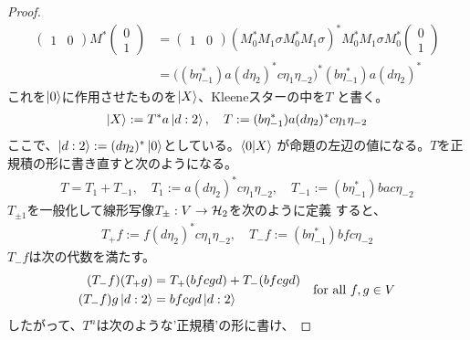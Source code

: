 {\begin{proof}
\begin{equation*}
\begin{split}
			\begin{pmatrix}
				1 & 0
			\end{pmatrix}M^*\begin{pmatrix}
				0 \\ 1
			\end{pmatrix} &= \begin{pmatrix}
				1 & 0
			\end{pmatrix}(M_0^*M_1\sigma M_0^*M_1\sigma)^*M_0^*M_1\sigma M_0^*
			\begin{pmatrix}
				0 \\ 1
			\end{pmatrix} \\
			&= \bigl((b\eta_{-1}^*)a(d\eta_2)^*c\eta_1\eta_{-2}\bigr)^*
			(b\eta_{-1}^*)a(d\eta_2)^*
		\end{split}\end{equation*}
		これを$\mathinner{|{0}\rangle}$に作用させたものを$\mathinner{|{X}\rangle}$、Kleeneスターの中を$T$
		と書く。
		\begin{equation*}\begin{split}
			\mathinner{|{X}\rangle} := T^*a\mathinner{|{d:2}\rangle},\quad
			T := (b\eta_{-1}^*)a(d\eta_2)^*c\eta_1\eta_{-2}
		\end{split}\end{equation*}
		ここで、$\mathinner{|{d:2}\rangle}:=(d\eta_2)^*\mathinner{|{0}\rangle}$としている。$\mathinner{\langle{0|X}\rangle}$
		が命題の左辺の値になる。$T$を正規積の形に書き直すと次のようになる。
		\begin{equation*}\begin{split}
			T = T_1 + T_{-1},\quad
			T_1 := a(d\eta_2)^*c\eta_1\eta_{-2},\quad
			T_{-1} := (b\eta_{-1}^*)bac\eta_{-2}
		\end{split}\end{equation*}
		$T_{\pm1}$を一般化して線形写像$T_\pm:V\to{\ensuremath{{\mathcal{H}}}}_2$を次のように定義
		すると、
		\begin{equation*}\begin{split}
			T_+f := f(d\eta_2)^*c\eta_1\eta_{-2},\quad
			T_-f := (b\eta_{-1}^*)bfc\eta_{-2}
		\end{split}\end{equation*}
		$T_{-}f$は次の代数を満たす。
		\begin{equation*}\begin{split}
			(T_-f)(T_+g) &= T_+(bfcgd) + T_-(bfcgd) \\
			(T_-f)g\mathinner{|{d:2}\rangle} &= bfcgd\mathinner{|{d:2}\rangle} \\
		\end{split}
			\quad\text{for all } f,g\in V
		\end{equation*}
		したがって、$T^n$は次のような'正規積'の形に書け、

\end{proof}}
